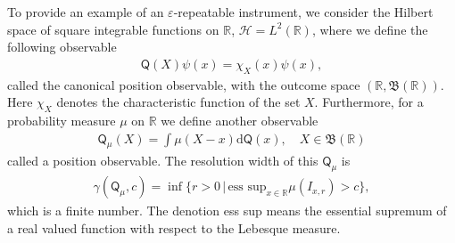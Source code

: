 \documentclass[a4paper,12pt]{wihuri}
\theoremstyle{definition}
\numberwithin{definition}{section}
\numberwithin{example}{section}
\numberwithin{theorem}{section}
\numberwithin{proposition}{section}
\numberwithin{lemma}{section}
\newcommand{\hi}{\mathcal{H}}%
\newcommand{\borel}{\mathfrak{B}}
\newcommand{\Q}{\mathsf{Q}}%
\newcommand{\real}{\mathbb{R}}%
\begin{document}
To provide an example of an $\varepsilon$-repeatable instrument, we consider the Hilbert space of square integrable functions on $\mathbb{R}$, $\hi = L^2(\mathbb{R})$, where we define the following observable
\begin{align*}
\Q(X)\psi(x) = \chi_X(x)\psi(x),
\end{align*}
called the canonical position observable, with the outcome space $(\mathbb{R}, \borel(\mathbb{R}))$\cite{heinosaari_ziman_2011_book}. Here $\chi_X$ denotes the characteristic function of the set $X$. Furthermore, for a probability measure $\mu$ on $\real$ we define another observable
\begin{align*}
\Q_\mu(X) = \int \mu(X-x)\text{d}\Q(x), \quad X \in \borel(\real)
\end{align*}
called a position observable. The resolution width of this $\Q_\mu$ is
\begin{align*}
\gamma(\Q_\mu, c) = \inf\{r > 0 \,|\,\text{ess sup}_{x\in\real} \mu(I_{x,r}) > c  \},
\end{align*}
which is a finite number. The denotion ess sup means the essential supremum of a real valued function with respect to the Lebesque measure.
\end{document}
